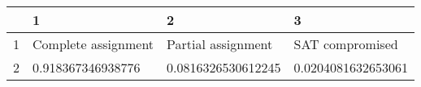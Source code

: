 \begin{table}[ht]
\centering
\begin{tabular}{rlll}
  \hline
 & 1 & 2 & 3 \\ 
  \hline
1 & Complete assignment & Partial assignment & SAT compromised \\ 
  2 & 0.918367346938776 & 0.0816326530612245 & 0.0204081632653061 \\ 
   \hline
\end{tabular}
\end{table}
